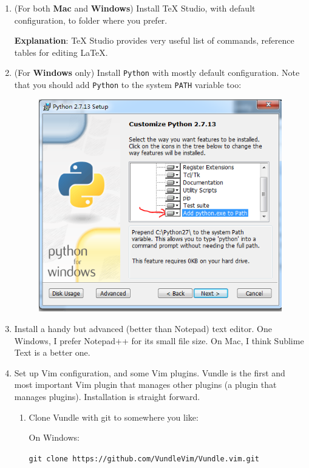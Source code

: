 \documentclass{article}
\begin{document}
\begin{enumerate}
    \item (For both \textbf{Mac} and \textbf{Windows}) Install \TeX{}
        Studio, with default configuration, to folder where you
        prefer. 

        \textbf{Explanation}: \TeX{} Studio provides very useful list
        of commands, reference tables for editing \LaTeX.

    \item (For \textbf{Windows} only) Install \texttt{Python} with
        mostly default configuration. Note that you should add
        \texttt{Python} to the system \texttt{PATH} variable too:
        \begin{figure}[H]
            \centering
            \includegraphics[width=0.6\linewidth]{pics/3.PNG}
        \end{figure}

    \item Install a handy but advanced (better than Notepad) text
        editor. One Windows, I prefer Notepad++ for its small file
        size. On Mac, I think Sublime Text is a better one.

    \item Set up Vim configuration, and some Vim plugins. Vundle is
        the first and most important Vim plugin that manages other
        plugins (a plugin that manages plugins). Installation is
        straight forward. 
        
        \begin{enumerate}
            \item Clone Vundle with git to somewhere you like:

                On Windows:

                \texttt{\footnotesize git clone
                https://github.com/VundleVim/Vundle.vim.git}


\end{enumerate}
\end{enumerate}
\end{document}
